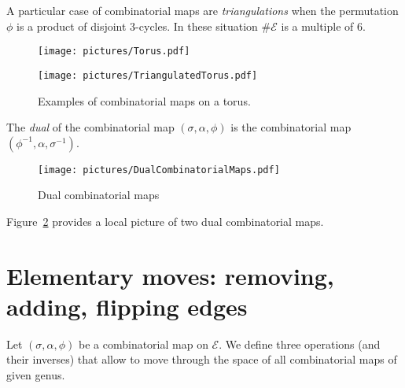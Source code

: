 \documentclass{article}
\def\cE{\mathcal{E}}
\begin{document}
A particular case of combinatorial maps are \emph{triangulations}
when the permutation $\phi$ is a product of disjoint 3-cycles.
In these situation $\# \cE$ is a multiple of $6$.

\begin{figure}[!ht]
\begin{minipage}{0.4\textwidth}
\begin{center}
\texttt{[image: pictures/Torus.pdf]}
\end{center}
\end{minipage}
\hspace{0.1\textwidth}
\begin{minipage}{0.4\textwidth}
\begin{center}
\texttt{[image: pictures/TriangulatedTorus.pdf]}
\end{center}
\end{minipage}
\caption{Examples of combinatorial maps on a torus.}
\label{fig:CombinatorialMapTori}
\end{figure}


The \emph{dual} of the combinatorial map $(\sigma, \alpha, \phi)$ is the combinatorial
map $(\phi^{-1}, \alpha, \sigma^{-1})$.
\begin{figure}[!ht]
\begin{center}
\texttt{[image: pictures/DualCombinatorialMaps.pdf]}
\end{center}
\caption{Dual combinatorial maps}
\label{fig:DualCombinatorialMaps}
\end{figure}

Figure~\ref{fig:DualCombinatorialMaps} provides a local picture of two dual
combinatorial maps.

\section{Elementary moves: removing, adding, flipping edges}
\label{sec:ElementaryMoves}
Let $(\sigma, \alpha, \phi)$ be a combinatorial map on $\cE$. We define three operations
(and their inverses) that allow to move through the space of all combinatorial maps of given genus.
\end{document}
